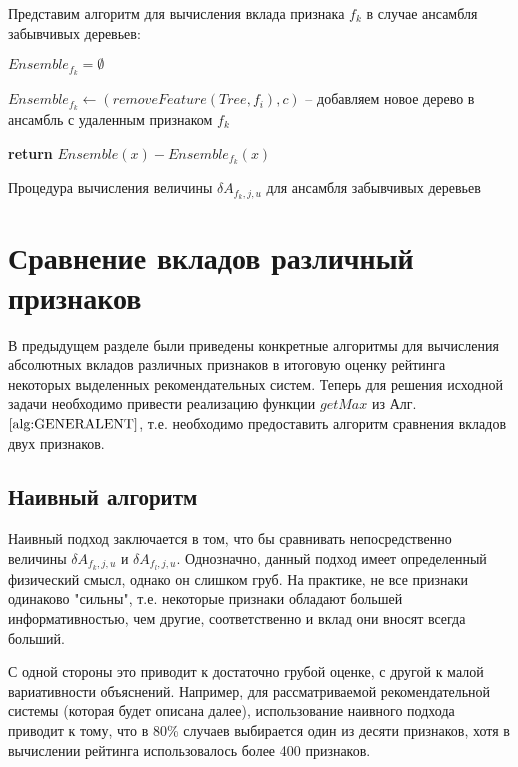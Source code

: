 \documentclass[12pt,a4paper]{report}
\begin{document}
Представим алгоритм для вычисления вклада признака $f_k$ в случае ансамбля забывчивых деревьев:

\begin{algorithm}[H]
\SetAlgoLined
{}

$Ensemble_{f_k} = \emptyset$

 {

	$Ensemble_{f_k} \leftarrow (removeFeature(Tree, f_i), c)$ -- добавляем новое дерево в ансамбль с удаленным признаком $f_k$
	
}

\textbf{return} $Ensemble(x) - Ensemble_{f_k}(x)$
\caption{Процедура вычисления величины $\delta A_{f_k, j, u}$ для ансамбля забывчивых деревьев}
\label{alg:CFIOT}
\end{algorithm}

\section{Сравнение вкладов различный признаков}
В предыдущем разделе были приведены конкретные алгоритмы для вычисления абсолютных вкладов различных признаков в итоговую оценку рейтинга некоторых выделенных рекомендательных систем. Теперь для решения исходной задачи необходимо привести реализацию функции $getMax$ из Алг. $\ref{alg:GENERALENT}$, т.е. необходимо предоставить алгоритм сравнения вкладов двух признаков.

\subsection{Наивный алгоритм}
Наивный подход заключается в том, что бы сравнивать непосредственно величины $\delta A_{f_k, j, u}$ и $\delta A_{f_l, j, u}$. Однозначно, данный подход имеет определенный физический смысл, однако он слишком груб. На практике, не все признаки одинаково "сильны", т.е. некоторые признаки обладают большей информативностью, чем другие, соответственно и вклад они вносят всегда больший.

С одной стороны это приводит к достаточно грубой оценке, с другой к малой вариативности объяснений.
Например, для рассматриваемой рекомендательной системы (которая будет описана далее), использование наивного подхода приводит к тому, что в 80\% случаев выбирается один из десяти признаков, хотя в вычислении рейтинга использовалось более 400 признаков.
\end{document}
